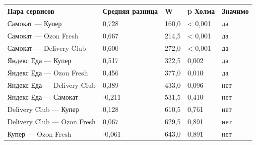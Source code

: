 {%
\small
\setlength{\tabcolsep}{3.0pt}
\renewcommand{\arraystretch}{1.10}
\begin{adjustbox}{max width=\textwidth}
\begin{tabular}{L{5.4cm}R{2.4cm}R{1.5cm}R{2.1cm}C{1.6cm}}
\toprule
Пара сервисов & Средняя разница & W & p Холма & Значимо \\
\midrule
Самокат — Купер & 0,728 & 160,0 & < 0,001 & да \\
Самокат — Ozon Fresh & 0,667 & 214,5 & < 0,001 & да \\
Самокат — Delivery Club & 0,600 & 272,0 & < 0,001 & да \\
Яндекс Еда — Купер & 0,517 & 322,5 & 0,002 & да \\
Яндекс Еда — Ozon Fresh & 0,456 & 377,0 & 0,010 & да \\
Яндекс Еда — Delivery Club & 0,389 & 433,0 & 0,096 & нет \\
Яндекс Еда — Самокат & -0,211 & 531,5 & 0,410 & нет \\
Delivery Club — Купер & 0,128 & 610,5 & 0,761 & нет \\
Delivery Club — Ozon Fresh & 0,067 & 629,5 & 0,891 & нет \\
Купер — Ozon Fresh & -0,061 & 643,0 & 0,891 & нет \\
\bottomrule
\end{tabular}
\end{adjustbox}
}